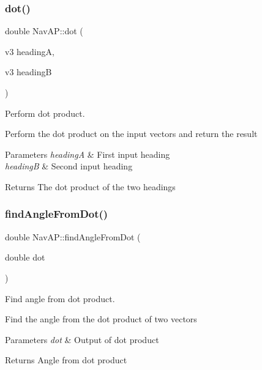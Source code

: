 \subsubsection{\texorpdfstring{dot()}{dot()}}
{\footnotesize\ttfamily double Nav\+A\+P\+::dot (\begin{DoxyParamCaption}\item[{v3}]{headingA,  }\item[{v3}]{headingB }\end{DoxyParamCaption})\hspace{0.3cm}{\ttfamily [private]}}



Perform dot product. 

Perform the dot product on the input vectors and return the result 
\begin{DoxyParams}{Parameters}
{\em headingA} & First input heading \\
\hline
{\em headingB} & Second input heading \\
\hline
\end{DoxyParams}
\begin{DoxyReturn}{Returns}
The dot product of the two headings 
\end{DoxyReturn}
\mbox{\label{classNavAP_a5949a1ac7aef3f5f453c2813347eec10}} 
\subsubsection{\texorpdfstring{find\+Angle\+From\+Dot()}{findAngleFromDot()}}
{\footnotesize\ttfamily double Nav\+A\+P\+::find\+Angle\+From\+Dot (\begin{DoxyParamCaption}\item[{double}]{dot }\end{DoxyParamCaption})\hspace{0.3cm}{\ttfamily [private]}}



Find angle from dot product. 

Find the angle from the dot product of two vectors 
\begin{DoxyParams}{Parameters}
{\em dot} & Output of dot product \\
\hline
\end{DoxyParams}
\begin{DoxyReturn}{Returns}
Angle from dot product 
\end{DoxyReturn}
\mbox{\label{classNavAP_abd22bda1a2e7e2b1048caf4c42c1d4b0}} 
